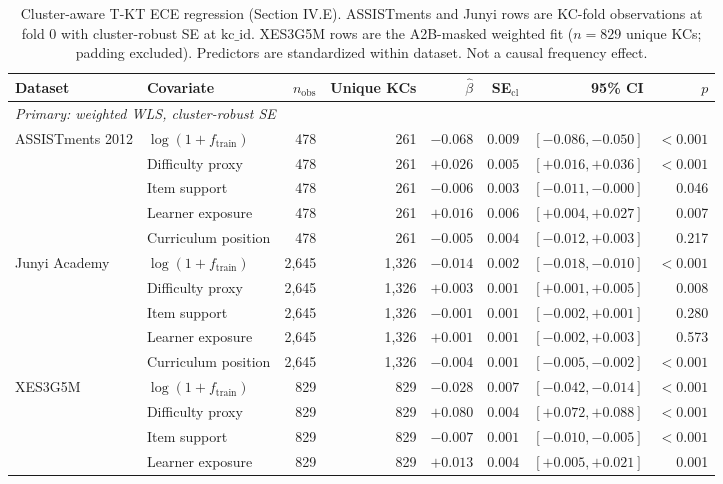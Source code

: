 \begin{table}[htbp]
\caption{Cluster-aware T-KT ECE regression (Section IV.E). ASSISTments and Junyi rows are KC-fold observations at fold 0 with cluster-robust SE at $\mathrm{kc\_id}$. XES3G5M rows are the A2B-masked weighted fit ($n=829$ unique KCs; padding excluded). Predictors are standardized within dataset. Not a causal frequency effect.}
\label{tab:s_regression_cluster}
\centering\scriptsize
\begin{tabular}{llrrrrrr}
\toprule
Dataset & Covariate & $n_{\mathrm{obs}}$ & Unique KCs & $\hat\beta$ & SE$_{\mathrm{cl}}$ & 95\% CI & $p$ \\
\midrule
\multicolumn{8}{l}{\emph{Primary: weighted WLS, cluster-robust SE}} \\
ASSISTments 2012 & $\log(1+f_{\mathrm{train}})$ & 478 & 261 & $-0.068$ & $0.009$ & $[-0.086,-0.050]$ & $<0.001$ \\
 & Difficulty proxy & 478 & 261 & $+0.026$ & $0.005$ & $[+0.016,+0.036]$ & $<0.001$ \\
 & Item support & 478 & 261 & $-0.006$ & $0.003$ & $[-0.011,-0.000]$ & 0.046 \\
 & Learner exposure & 478 & 261 & $+0.016$ & $0.006$ & $[+0.004,+0.027]$ & 0.007 \\
 & Curriculum position & 478 & 261 & $-0.005$ & $0.004$ & $[-0.012,+0.003]$ & 0.217 \\
\midrule
Junyi Academy & $\log(1+f_{\mathrm{train}})$ & 2,645 & 1,326 & $-0.014$ & $0.002$ & $[-0.018,-0.010]$ & $<0.001$ \\
 & Difficulty proxy & 2,645 & 1,326 & $+0.003$ & $0.001$ & $[+0.001,+0.005]$ & 0.008 \\
 & Item support & 2,645 & 1,326 & $-0.001$ & $0.001$ & $[-0.002,+0.001]$ & 0.280 \\
 & Learner exposure & 2,645 & 1,326 & $+0.001$ & $0.001$ & $[-0.002,+0.003]$ & 0.573 \\
 & Curriculum position & 2,645 & 1,326 & $-0.004$ & $0.001$ & $[-0.005,-0.002]$ & $<0.001$ \\
\midrule
XES3G5M & $\log(1+f_{\mathrm{train}})$ & 829 & 829 & $-0.028$ & $0.007$ & $[-0.042,-0.014]$ & $<0.001$ \\
 & Difficulty proxy & 829 & 829 & $+0.080$ & $0.004$ & $[+0.072,+0.088]$ & $<0.001$ \\
 & Item support & 829 & 829 & $-0.007$ & $0.001$ & $[-0.010,-0.005]$ & $<0.001$ \\
 & Learner exposure & 829 & 829 & $+0.013$ & $0.004$ & $[+0.005,+0.021]$ & 0.001 \\

\end{tabular}
\end{table}
